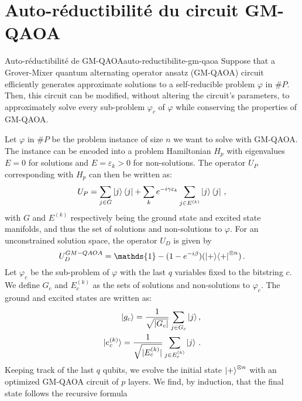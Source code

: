 \begin{comment}
\end{comment}


\chapter{Auto-réductibilité du circuit GM-QAOA}


\begin{maintheorem}{Auto-réductibilité de GM-QAOA}{auto-reductibilite-gm-qaoa}
    Suppose that a Grover-Mixer quantum alternating operator ansatz (GM-QAOA) circuit efficiently generates approximate solutions to a self-reducible problem $\varphi$ in $\#P$. Then, this circuit can be modified, without altering the circuit's parameters, to approximately solve every sub-problem $\varphi_{c}$ of $\varphi$ while conserving the properties of GM-QAOA. 
\end{maintheorem}

Let $\varphi$ in $\#P$ be the problem instance of size $n$ we want to solve  with GM-QAOA. The instance can be encoded into a problem Hamiltonian $H_{p}$ with eigenvalues $E=0$ for solutions and $E=\varepsilon_{k}>0$ for non-solutions. The operator $U_{P}$ corresponding with $H_{p}$ can then be written as:
\begin{equation}
    U_{P} = \sum_{j \in G} \ket{j}\bra{j} + \sum_{k} e^{-i \gamma \varepsilon_{k}} \sum_{j \in E^{(k)}} \ket{j}\bra{j} \,,
\end{equation} 
with $G$ and $E^{(k)}$ respectively being the ground state and excited state manifolds, and thus the set of solutions and non-solutions to $\varphi$. For an unconstrained solution space, the operator $U_{D}$ is given by
\begin{equation}
    U_{D}^{GM-QAOA} = \mathds{1} - (1 - e^{-i\beta}) (\ket{+}\!\bra{+}^{\otimes n}) \,.
\end{equation}
Let $\varphi_{c}$ be the sub-problem of $\varphi$ with the last $q$ variables fixed to the bitstring $c$. We define $G_{c}$ and $E_{c}^{(k)}$ as the sets of solutions and non-solutions to $\varphi_{c}$. The ground and excited states are written as:
\begin{align}
    \ket{g_{c}} = \frac{1}{\sqrt{ \lvert G_{c} \rvert }} \sum_{j \in G_{c}} \ket{j}, \\
    \ket{e^{(k)}_{c}} = \frac{1}{\sqrt{ \lvert E^{(k)}_{c} \rvert }} \sum_{j \in E^{(k)}_{c}} \ket{j} \,.
\end{align}
Keeping track of the last $q$ qubits, we evolve the initial state $\ket{+}^{\otimes n}$ with an optimized GM-QAOA circuit of $p$ layers. We find, by induction, that the final state follows the recursive formula

